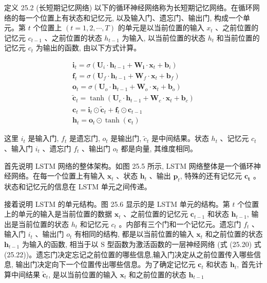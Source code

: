 \documentclass[10pt]{article}
\begin{document}
定义 25.2 (长短期记忆网络) 以下的循环神经网络称为长短期记忆网络。在循环网络的每一个位置上有状态和记忆元, 以及输入门、遗忘门、输出门, 构成一个单元。第 $t$ 个位置上 $(t=1,2, \cdots, T)$ 的单元是以当前位置的输入 $x_{t}$ 、之前位置的记忆元 $c_{t-1}$ 、之前位置的状态 $h_{t-1}$ 为输入, 以当前位置的状态 $h_{t}$ 和当前位置的记忆元 $c_{t}$ 为输出的函数, 由以下方式计算。


\begin{gather*}
\boldsymbol{i}_{t}=\sigma\left(\boldsymbol{U}_{i} \cdot \boldsymbol{h}_{t-1}+\boldsymbol{W}_{\boldsymbol{i}} \cdot \boldsymbol{x}_{t}+\boldsymbol{b}_{i}\right)  \tag{25.20}\\
\boldsymbol{f}_{t}=\sigma\left(\boldsymbol{U}_{f} \cdot \boldsymbol{h}_{t-1}+\boldsymbol{W}_{f} \cdot \boldsymbol{x}_{t}+\boldsymbol{b}_{f}\right)  \tag{25.21}\\
\boldsymbol{o}_{t}=\sigma\left(\boldsymbol{U}_{o} \cdot \boldsymbol{h}_{t-1}+\boldsymbol{W}_{o} \cdot \boldsymbol{x}_{t}+\boldsymbol{b}_{o}\right)  \tag{25.22}\\
\tilde{\boldsymbol{c}}_{t}=\tanh \left(\boldsymbol{U}_{c} \cdot \boldsymbol{h}_{t-1}+\boldsymbol{W}_{c} \cdot \boldsymbol{x}_{t}+\boldsymbol{b}_{c}\right)  \tag{25.23}\\
\boldsymbol{c}_{t}=\boldsymbol{i}_{t} \odot \tilde{\boldsymbol{c}}_{t}+\boldsymbol{f}_{t} \odot \boldsymbol{c}_{t-1}  \tag{25.24}\\
\boldsymbol{h}_{t}=\boldsymbol{o}_{t} \odot \tanh \left(\boldsymbol{c}_{t}\right) \tag{25.25}
\end{gather*}


这里 $i_{t}$ 是输入门, $f_{t}$ 是遗忘门, $o_{t}$ 是输出门, $\tilde{c}_{t}$ 是中间结果。状态 $h_{t}$ 、记忆元 $c_{t}$ 、输入门 $i_{t}$ 、遗忘门 $f_{t}$ 、输出门 $o_{t}$ 都是向量, 其维度相同。

首先说明 LSTM 网络的整体架构。如图 25.5 所示, LSTM 网络整体是一个循环神经网络。在每一个位置上有输入 $\boldsymbol{x}_{t}$ 、状态 $\boldsymbol{h}_{t}$ 、输出 $\boldsymbol{p}_{t}$, 特殊的还有记忆元 $\boldsymbol{c}_{\boldsymbol{t}}$ 。状态和记忆元的信息在 LSTM 单元之间传递。

接着说明 LSTM 的单元结构。图 25.6 显示的是 LSTM 单元的结构。第 $t$ 个位置上的单元的输入是当前位置的数据 $\boldsymbol{x}_{t}$ 、之前位置的记忆元 $\boldsymbol{c}_{t-1}$ 和状态 $\boldsymbol{h}_{t-1}$, 输出是当前位置的状态 $h_{t}$ 和记忆元 $c_{t}$ 。内部有三个门和一个记忆元。遗忘门 $f_{t}$ 、输入门 $i_{t}$ 、输出门 $o_{t}$ 有相同的结构, 都是以当前位置的输入 $\boldsymbol{x}_{t}$ 和之前位置的状态 $\boldsymbol{h}_{t-1}$ 为输入的函数, 相当于以 $\mathrm{S}$ 型函数为激活函数的一层神经网络 (式 (25.20) 式 (25.22))。遗忘门决定忘记之前位置的哪些信息,输入门决定从之前位置传入哪些信息, 输出门决定向下一个位置传出哪些信息。为了确定记忆元 $\boldsymbol{c}_{t}$ 和状态 $\boldsymbol{h}_{t}$, 首先计算中间结果 $\tilde{\boldsymbol{c}}_{t}$, 是以当前位置的输入 $\boldsymbol{x}_{t}$ 和之前位置的状态 $\boldsymbol{h}_{t-1}$
\end{document}
